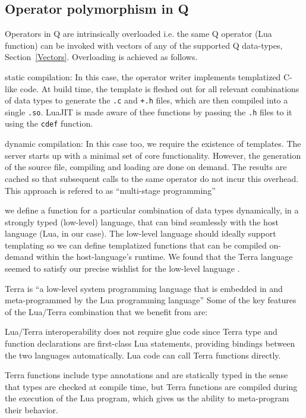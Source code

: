 \subsection{Operator polymorphism in Q}
\label{polymorphism}

Operators in Q are intrinsically overloaded i.e. the same Q operator
(Lua function) can be invoked with vectors of any of the supported Q data-types,
Section~\ref{Vectors}.
Overloading is achieved as follows.
\be
\item static compilation: In this case, the operator writer implements
  templatized C-like code. At build time, the template is fleshed out for all
  relevant combinations of data types to generate the {\tt .c} and {\tt +.h}
  files, which are then compiled into a single {\tt .so}. LuaJIT is made aware
  of thee functions by passing the {\tt .h} files to it using 
the {\tt cdef} function.
\item dynamic compilation: 
  In this case too, we require the existence of templates. 
  The server starts up with a minimal set of core functionality. 
  However, the generation of the source file, compiling and loading
  are done on demand. The results are cached
  so that subsequent calls to the same operator do not incur this overhead.
  This approach is refered to as  ``multi-stage programming''
\item we define a function for a particular combination of data types
  dynamically, in a strongly typed (low-level) language, that can bind seamlessly
  with the host language (Lua, in our case). The low-level language should ideally support templating so we can define templatized functions that can be compiled on-demand within the host-language's runtime.
  We found that the Terra language seemed to satisfy our precise wishlist for
  the low-level language \cite{devito2015}.

Terra is ``a low-level system programming language that is embedded in and
meta-programmed by the Lua programming language'' 
Some of the key features of the Lua/Terra combination that we benefit 
from are:
\be
\item Lua/Terra interoperability does not require glue code since Terra type and function declarations are first-class Lua statements, providing bindings between the two languages automatically. Lua code can call Terra functions directly.

\item Terra functions include type annotations and are statically typed in the sense that types are checked at compile time, but Terra functions are compiled during the execution of the Lua program, which gives us the ability to meta-program their behavior.

